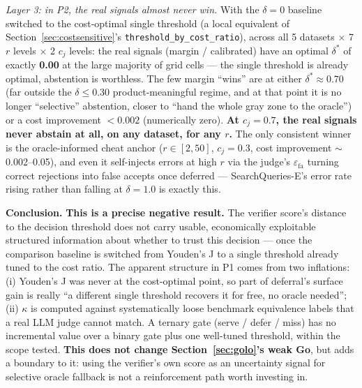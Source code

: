 \documentclass[11pt]{article}
\begin{document}
\emph{Layer 3: in P2, the real signals almost never win.} With the $\delta{=}0$ baseline switched to the cost-optimal single threshold (a local equivalent of Section~\ref{sec:costsensitive}'s \texttt{threshold\_\allowbreak{}by\_\allowbreak{}cost\_\allowbreak{}ratio}), across all 5 datasets $\times$ 7 $r$ levels $\times$ 2 $c_j$ levels: the real signals (margin / calibrated) have an optimal $\delta^*$ of exactly \textbf{0.00} at the large majority of grid cells --- the single threshold is already optimal, abstention is worthless. The few margin ``wins'' are at either $\delta^* \approx 0.70$ (far outside the $\delta \le 0.30$ product-meaningful regime, and at that point it is no longer ``selective'' abstention, closer to ``hand the whole gray zone to the oracle'') or a cost improvement $< 0.002$ (numerically zero). \textbf{At $c_j = 0.7$, the real signals never abstain at all, on any dataset, for any $r$.} The only consistent winner is the oracle-informed cheat anchor ($r \in [2, 50]$, $c_j = 0.3$, cost improvement $\sim$0.002--0.05), and even it self-injects errors at high $r$ via the judge's $\varepsilon_\text{fa}$ turning correct rejections into false accepts once deferred --- SearchQueries-E's error rate rising rather than falling at $\delta = 1.0$ is exactly this.

\textbf{Conclusion.} \textbf{This is a precise negative result.} The verifier score's distance to the decision threshold does not carry usable, economically exploitable structured information about whether to trust this decision --- once the comparison baseline is switched from Youden's J to a single threshold already tuned to the cost ratio. The apparent structure in P1 comes from two inflations: (i) Youden's J was never at the cost-optimal point, so part of deferral's surface gain is really ``a different single threshold recovers it for free, no oracle needed''; (ii) $\kappa$ is computed against systematically loose benchmark equivalence labels that a real LLM judge cannot match. A ternary gate (serve / defer / miss) has no incremental value over a binary gate plus one well-tuned threshold, within the scope tested. \textbf{This does not change Section~\ref{sec:golo}'s weak Go}, but adds a boundary to it: using the verifier's own score as an uncertainty signal for selective oracle fallback is not a reinforcement path worth investing in.
\end{document}
